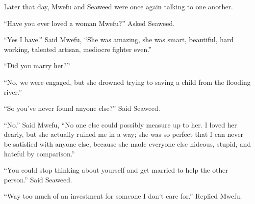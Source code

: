 \tbreak

Later that day, Mwefu and Seaweed were once again talking to one another.

``Have you ever loved a woman Mwefu?'' Asked Seaweed.

``Yes I have.'' Said Mwefu, ``She was amazing, she was smart, beautiful, hard working, talented artisan, mediocre fighter even.''

``Did you marry her?''

``No, we were engaged, but she drowned trying to saving a child from the flooding river.''

``So you've never found anyone else?'' Said Seaweed.

``No.'' Said Mwefu, ``No one else could possibly measure up to her. I loved her dearly, but she actually ruined me in a way; she was so perfect that I can never be satisfied with anyone else, because she made everyone else hideous, stupid, and hateful by comparison.''

``You could stop thinking about yourself and get married to help the other person.'' Said Seaweed.

``Way too much of an investment for someone I don't care for.'' Replied Mwefu.
